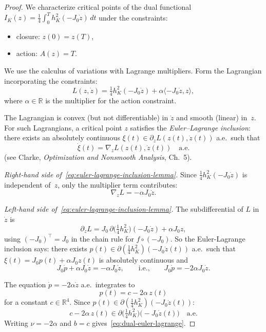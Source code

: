 \begin{proof}
We characterize critical points of the dual functional
$I_K(z) = \frac{1}{4}\int_0^T h_K^2(-J_0\dot{z}) \, dt$
under the constraints:
\begin{itemize}
\item closure: $z(0) = z(T)$,
\item action: $A(z) = T$.
\end{itemize}

We use the calculus of variations with Lagrange multipliers.
Form the Lagrangian incorporating the constraints:
\[
  L(z, \dot{z}) = \tfrac{1}{4}h_K^2(-J_0\dot{z}) + \alpha\langle -J_0\dot{z}, z\rangle,
\]
where $\alpha \in \mathbb{R}$ is the multiplier for the action constraint.

The Lagrangian is convex (but not differentiable) in $\dot{z}$
and smooth (linear) in~$z$.
For such Lagrangians, a critical point $z$ satisfies the
\emph{Euler--Lagrange inclusion}: there exists an absolutely continuous
$\xi(t) \in \partial_{\dot{z}} L(z(t), \dot{z}(t))$ a.e.\ such that
\begin{equation}\label{eq:euler-lagrange-inclusion-lemma}
  \dot{\xi}(t) = \nabla_z L(z(t), \dot{z}(t)) \quad\text{a.e.}
\end{equation}
(see Clarke, \emph{Optimization and Nonsmooth Analysis}, Ch.~5).

\emph{Right-hand side of~\eqref{eq:euler-lagrange-inclusion-lemma}.}
Since $\tfrac{1}{4}h_K^2(-J_0\dot{z})$ is independent of~$z$,
only the multiplier term contributes:
\[
  \nabla_z L = -\alpha J_0 \dot{z}.
\]

\emph{Left-hand side of~\eqref{eq:euler-lagrange-inclusion-lemma}.}
The subdifferential of $L$ in $\dot{z}$ is
\[
  \partial_{\dot{z}} L
  = J_0\, \partial\bigl(\tfrac{1}{4}h_K^2\bigr)(-J_0\dot{z})
    + \alpha J_0 z,
\]
using $(-J_0)^\top = J_0$ in the chain rule for $f \circ (-J_0)$.
So the Euler-Lagrange inclusion says: there exists $p(t) \in \partial(\tfrac{1}{4}h_K^2)(-J_0\dot{z}(t))$
a.e.\ such that $\xi(t) = J_0 p(t) + \alpha J_0 z(t)$ is absolutely continuous and
\[
  J_0 \dot{p} + \alpha J_0 \dot{z}
  = -\alpha J_0 \dot{z},
  \qquad\text{i.e.,}\qquad
  J_0 \dot{p} = -2\alpha J_0 \dot{z}.
\]

The equation $\dot{p} = -2\alpha \dot{z}$ a.e.\ integrates to
\[
  p(t) = c - 2\alpha\, z(t)
\]
for a constant $c \in \mathbb{R}^4$.
Since $p(t) \in \partial(\tfrac{1}{4}h_K^2)(-J_0\dot{z}(t))$:
\[
  c - 2\alpha\, z(t)
  \in \partial\bigl(\tfrac{1}{4}h_K^2\bigr)\bigl(-J_0\dot{z}(t)\bigr)
  \quad \text{a.e.}
\]
Writing $\nu = -2\alpha$ and $b = c$ gives~\eqref{eq:dual-euler-lagrange}.
\end{proof}

